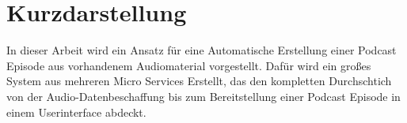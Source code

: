 \thispagestyle{empty}
\section*{Kurzdarstellung}
\label{sec:kurzdarstellung}
In dieser Arbeit wird ein Ansatz für eine Automatische Erstellung einer Podcast Episode aus vorhandenem Audiomaterial vorgestellt.
Dafür wird ein großes System aus mehreren Micro Services Erstellt, das den kompletten Durchschtich von der Audio-Datenbeschaffung bis zum Bereitstellung einer Podcast Episode in einem Userinterface abdeckt.






